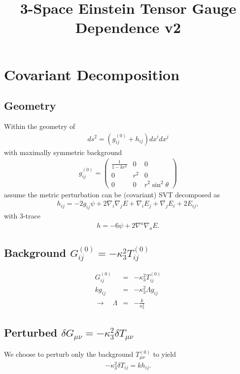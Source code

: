 \documentclass[10pt,letterpaper]{article}
\title{3-Space Einstein Tensor Gauge Dependence v2}
\date{}
\numberwithin{equation}{section}
\begin{document}
 
\maketitle
\noindent 
\section{Covariant Decomposition}

\subsection{Geometry} 
\label{S1}
Within the geometry of 
\begin{eqnarray}
ds^2 = (g_{ij}^{(0)} + h_{ij})dx^i dx^j 
\end{eqnarray}
with maximally symmetric background
\begin{eqnarray}
g_{ij}^{(0)} = \begin{pmatrix} \frac{1}{1-kr^2} &0&0\\ 0&r^2&0\\0&0&r^2\sin^2\theta\end{pmatrix}
\end{eqnarray}
assume the metric perturbation can be (covariant) SVT decomposed as
\begin{eqnarray}
h_{ij} = -2 g_{ij}\psi + 2\nabla_i\nabla_j E + \nabla_i E_j + \nabla_j E_i + 2E_{ij},
\label{svt}
\end{eqnarray}
with 3-trace
\begin{eqnarray}
h = -6 \psi + 2\nabla^a\nabla_a E.
\end{eqnarray}

\subsection{Background $G^{(0)}_{ij} = - \kappa^2_3 T^{(0)}_{ij}$}
\begin{eqnarray}
G^{(0)}_{ij} &=& - \kappa^2_3 T^{(0)}_{ij}
\nonumber\\
k g_{ij} &=& - \kappa^2_3 \Lambda g_{ij}
\nonumber\\
\to\quad  \Lambda &=& -\frac{k}{\kappa^2_3}
\label{lambdakappa}
\end{eqnarray}

\subsection{Perturbed $\delta G_{\mu\nu} =-\kappa^2_3 \delta T_{\mu\nu}$}
We choose to perturb only the background $T_{\mu\nu}^{(0)}$ to yield
\begin{eqnarray}
-\kappa_3^2 \delta T_{ij} = k h_{ij}.
\end{eqnarray}
\end{document}
